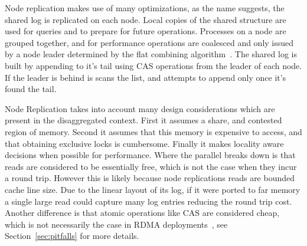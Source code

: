 Node replication makes use of many optimizations, as the name suggests, the
shared log is replicated on each node. Local copies of the shared structure are
used for queries and to prepare for future operations. Processes on a node are
grouped together, and for performance operations are coalesced and only issued
by a node leader determined by the flat combining algorithm~\cite{flat-combine}.
The shared log is built by appending to it's tail using CAS operations from the
leader of each node. If the leader is behind is scans the list, and attempts to
append only once it's found the tail.

Node Replication takes into account many design considerations which are present
in the disaggregated context. First it assumes a share, and contested region of
memory. Second it assumes that this memory is expensive to access, and that
obtaining exclusive locks is cumbersome. Finally it makes locality aware
decisions when possible for performance. Where the parallel breaks down is that
reads are considered to be essentially free, which is not the case when they
incur a round trip. However this is likely because node replications reads are
bounded cache line size. Due to the linear layout of its log, if it were ported
to far memory a single large read could capture many log entries reducing the
round trip cost.  Another difference is that atomic operations like CAS are
considered cheap, which is not necessarily the case in RDMA
deployments~\cite{design-guidelines}, see Section~\ref{sec:pitfalls} for more
details. 


